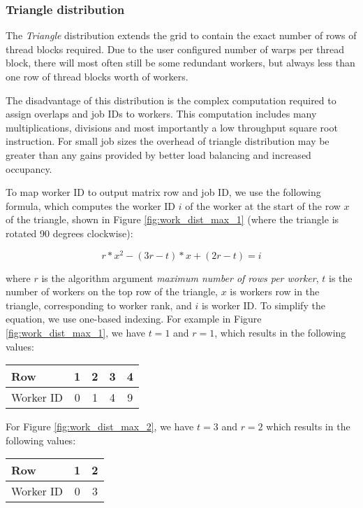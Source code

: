\subsubsection{Triangle distribution}
The \textit{Triangle} distribution extends the grid to contain the exact number of rows of thread blocks required. Due to the user configured number of warps per thread block, there will most often still be some redundant workers, but always less than one row of thread blocks worth of workers.

The disadvantage of this distribution is the complex computation required to assign overlaps and job IDs to workers. This computation includes many multiplications, divisions and most importantly a low throughput square root instruction. For small job sizes the overhead of triangle distribution may be greater than any gains provided by better load balancing and increased occupancy. 

To map worker ID to output matrix row and job ID, we use the following formula, which computes the worker ID $i$ of the worker at the start of the row $x$ of the triangle, shown in Figure \ref{fig:work_dist_max_1} (where the triangle is rotated 90 degrees clockwise):

\begin{equation}
\label{eq:first_row_worker}
	r*x^2 - (3r - t)*x + (2r - t) = i
\end{equation}


where $r$ is the algorithm argument \textit{maximum number of rows per worker}, $t$ is the number of workers on the top row of the triangle, $x$ is workers row in the triangle, corresponding to worker rank, and $i$ is worker ID. To simplify the equation, we use one-based indexing. For example in Figure \ref{fig:work_dist_max_1}, we have $t = 1$ and $r = 1$, which results in the following values:


\begin{center}
	\begin{tabular}{|l|c|c|c|c|} 
		\hline
		Row&1&2&3&4\\
		\hline
		Worker ID&0&1&4&9\\
		\hline
	\end{tabular}
\end{center}


For Figure \ref{fig:work_dist_max_2}, we have $t = 3$ and $r = 2$ which results in the following values:

\begin{center}
	\begin{tabular}{|l|c|c|} 
		\hline
		Row&1&2\\
		\hline
		Worker ID&0&3\\
		\hline
	\end{tabular}
\end{center}


